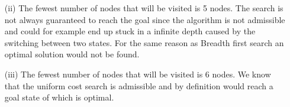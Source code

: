 \begin{enumerate}
\begin{enumerate}
\begin{enumerate}
					\item[(ii)] The fewest number of nodes that will be visited is 5 nodes. The search is not always guaranteed to reach the goal since the algorithm is not admissible and could for example end up stuck in a infinite depth caused by the switching between two states.  For the same reason as Breadth first search an optimal solution would not be found.
					
					\item[(iii)]  The fewest number of nodes that will be visited is 6 nodes.  We know that the uniform cost search is admissible and by definition would reach a goal state of which is optimal.
					
				\end{enumerate}
		\end{enumerate}

\end{enumerate}





